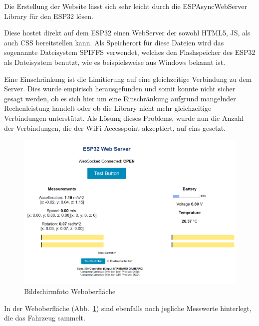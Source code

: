 \vspace{\baselineskip}
Die Erstellung der Website lässt sich sehr leicht durch die ESPAsyncWebServer Library für den ESP32 lösen. \par

Diese hostet direkt auf dem ESP32 einen WebServer der sowohl HTML5, JS, als auch CSS bereitstellen kann. Als Speicherort für diese Dateien wird das sogenannte Dateisystem SPIFFS verwendet, welches den Flashspeicher des ESP32 als Dateisystem benutzt, wie es beispielsweise aus Windows bekannt ist.\par

Eine Einschränkung ist die Limitierung auf eine gleichzeitige Verbindung zu dem Server. 
Dies wurde empirisch herausgefunden und somit konnte nicht sicher gesagt werden, ob es sich hier um eine Einschränkung aufgrund mangelnder Rechenleistung handelt oder ob die Library nicht mehr gleichzeitige Verbindungen unterstützt. Als Lösung dieses Problems, wurde nun die Anzahl der Verbindungen, die der WiFi Accesspoint akzeptiert, auf eins gesetzt.\par


\vspace{\baselineskip}

\begin{figure}[!ht]
	\centering
	\includegraphics[width=\textwidth]{bilder/WebValues.png}
	\caption{Bildschirmfoto Weboberfläche}
	\label{bild:webvalues}
\end{figure}

In der Weboberfläche (Abb.~\ref{bild:webvalues}) sind ebenfalls noch jegliche Messwerte hinterlegt, die das Fahrzeug sammelt.\par

